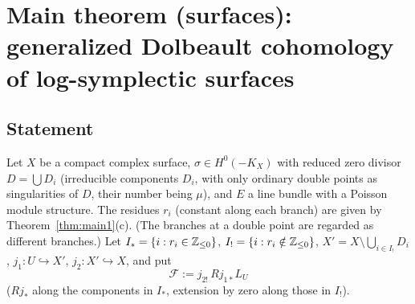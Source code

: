 \section{Main theorem (surfaces): generalized Dolbeault cohomology of log-symplectic surfaces}\label{sec:main2}
\subsection{Statement}
Let $X$ be a compact complex surface, $\sigma\in H^0(-K_X)$ with reduced zero divisor $D=\bigcup D_i$ (irreducible components $D_i$, with only ordinary double points as singularities of $D$, their number being $\mu$), and $E$ a line bundle with a Poisson module structure. The residues $r_i$ (constant along each branch) are given by Theorem~\ref{thm:main1}(c). (The branches at a double point are regarded as different branches.)
Let $I_*=\{i:r_i\in\mathbb Z_{\le0}\}$, $I_!=\{i:r_i\notin\mathbb Z_{\le0}\}$, $X'=X\setminus\bigcup_{i\in I_!}D_i$, $j_1:U\hookrightarrow X'$, $j_2:X'\hookrightarrow X$, and put
\[\mathcal F:=j_{2!}\,Rj_{1*}L_U\]
($Rj_*$ along the components in $I_*$, extension by zero along those in $I_!$).

